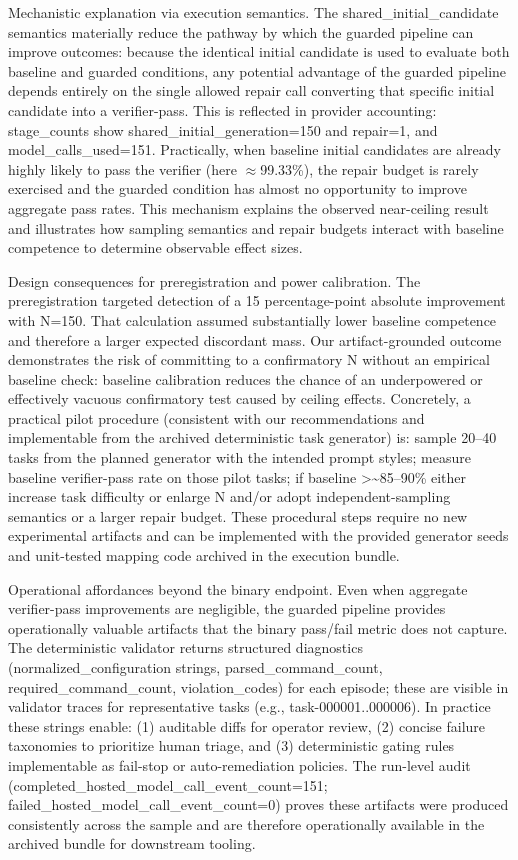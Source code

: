 \documentclass[conference]{IEEEtran}
\begin{document}
Mechanistic explanation via execution semantics. The shared\_initial\_candidate semantics materially reduce the pathway by which the guarded pipeline can improve outcomes: because the identical initial candidate is used to evaluate both baseline and guarded conditions, any potential advantage of the guarded pipeline depends entirely on the single allowed repair call converting that specific initial candidate into a verifier-pass. This is reflected in provider accounting: stage\_counts show shared\_initial\_generation=150 and repair=1, and model\_calls\_used=151. Practically, when baseline initial candidates are already highly likely to pass the verifier (here \ensuremath{\approx}99.33\%), the repair budget is rarely exercised and the guarded condition has almost no opportunity to improve aggregate pass rates. This mechanism explains the observed near-ceiling result and illustrates how sampling semantics and repair budgets interact with baseline competence to determine observable effect sizes.

Design consequences for preregistration and power calibration. The preregistration targeted detection of a 15 percentage-point absolute improvement with N=150. That calculation assumed substantially lower baseline competence and therefore a larger expected discordant mass. Our artifact-grounded outcome demonstrates the risk of committing to a confirmatory N without an empirical baseline check: baseline calibration reduces the chance of an underpowered or effectively vacuous confirmatory test caused by ceiling effects. Concretely, a practical pilot procedure (consistent with our recommendations and implementable from the archived deterministic task generator) is: sample 20--40 tasks from the planned generator with the intended prompt styles; measure baseline verifier-pass rate on those pilot tasks; if baseline >\textasciitilde{}85--90\% either increase task difficulty or enlarge N and/or adopt independent-sampling semantics or a larger repair budget. These procedural steps require no new experimental artifacts and can be implemented with the provided generator seeds and unit-tested mapping code archived in the execution bundle.

Operational affordances beyond the binary endpoint. Even when aggregate verifier-pass improvements are negligible, the guarded pipeline provides operationally valuable artifacts that the binary pass/fail metric does not capture. The deterministic validator returns structured diagnostics (normalized\_configuration strings, parsed\_command\_count, required\_command\_count, violation\_codes) for each episode; these are visible in validator traces for representative tasks (e.g., task-000001..000006). In practice these strings enable: (1) auditable diffs for operator review, (2) concise failure taxonomies to prioritize human triage, and (3) deterministic gating rules implementable as fail-stop or auto-remediation policies. The run-level audit (completed\_hosted\_model\_call\_event\_count=151; failed\_hosted\_model\_call\_event\_count=0) proves these artifacts were produced consistently across the sample and are therefore operationally available in the archived bundle for downstream tooling.
\end{document}
